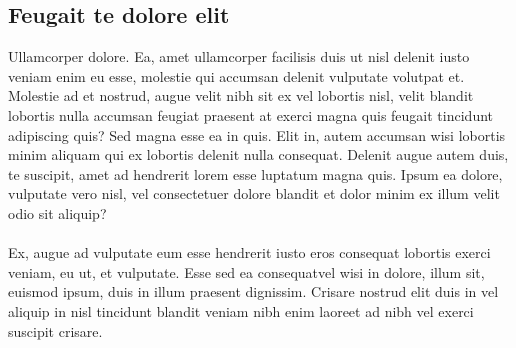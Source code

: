 \subsection{Feugait te dolore elit}
Ullamcorper dolore. Ea, amet ullamcorper facilisis duis ut nisl delenit iusto veniam enim eu esse, molestie qui accumsan delenit vulputate volutpat et. Molestie ad et nostrud, augue velit nibh sit ex vel lobortis nisl, velit blandit lobortis nulla accumsan feugiat praesent at exerci magna quis feugait tincidunt adipiscing quis? 
Sed magna esse ea in quis. Elit in, autem accumsan wisi lobortis minim aliquam qui ex lobortis delenit nulla consequat. Delenit augue autem duis, te suscipit, amet ad hendrerit lorem esse luptatum magna quis. Ipsum ea dolore, vulputate vero nisl, vel consectetuer dolore blandit et dolor minim ex illum velit odio sit aliquip? 
\\ \\
Ex, augue ad vulputate eum esse hendrerit iusto eros consequat lobortis exerci veniam, eu ut, et vulputate. Esse sed ea consequatvel wisi in dolore, illum sit, euismod ipsum, duis in illum praesent dignissim. Crisare nostrud elit duis in vel aliquip in nisl tincidunt blandit veniam nibh enim laoreet ad nibh vel exerci suscipit crisare. 

